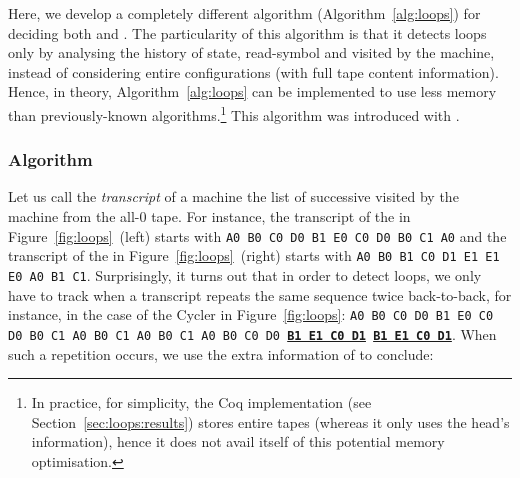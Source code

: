 Here, we develop a completely different algorithm (Algorithm~\ref{alg:loops}) for deciding both \cyclers and \TCs. The particularity of this algorithm is that it detects loops only by analysing the history of state, read-symbol and \headposs visited by the machine, instead of considering entire configurations (\ie with full tape content information). Hence, in theory, Algorithm~\ref{alg:loops} can be implemented to use less memory than previously-known algorithms.\footnote{In practice, for simplicity, the Coq implementation (see Section~\ref{sec:loops:results}) stores entire tapes (whereas it only uses the head's information), hence it does not avail itself of this potential memory optimisation.} This algorithm was introduced with \CoqBB.

\subsubsection{Algorithm}\label{sec:loops:algo}





Let us call the \textit{transcript} of a machine the list of successive \ssps visited by the machine from the all-0 tape. For instance, the transcript of the \cycler in Figure~\ref{fig:loops}~(left) starts with \texttt{A0 B0 C0 D0 B1 E0 C0 D0 B0 C1 A0} and the transcript of the \TC in Figure~\ref{fig:loops}~(right) starts with \texttt{A0 B0 B1 C0 D1 E1 E1 E0 A0 B1 C1}. Surprisingly, it turns out that in order to detect loops, we only have to track when a transcript repeats the same sequence twice back-to-back, for instance, in the case of the Cycler in Figure~\ref{fig:loops}: \texttt{A0 B0 C0 D0 B1 E0 C0 D0 B0 C1 A0 B0 C1 A0 B0 C1 A0 B0 C0 D0 \textbf{\underline{B1 E1 C0 D1}} \textbf{\underline{B1 E1 C0 D1}}}. When such a repetition occurs, we use the extra information of \headpos to conclude:

